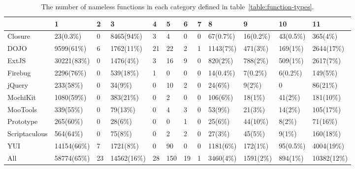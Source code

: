\documentclass[10pt, preprint]{sigplanconf}
\begin{document}
\begin{table}
\centering
  \begin{tabular}{ | l | l | l | l | l | l | l | l | l | l | l | l |}
  \hline
     & 1 & 2 & 3 & 4 & 5 & 6 & 7 & 8 & 9 & 10 & 11 \\ 
  \hline 
   Closure       & 23(0.3\%)  & 0  & 8465(94\%) & 3  & 4  & 0  & 0 & 67(0.7\%)& 16(0.2\%)& 43(0.5\%)& 365(4\%)\\ 
  \hline 
   DOJO          & 9599(61\%) & 6  & 1762(11\%) & 21 & 22 & 2  & 1 & 1143(7\%)& 471(3\%) & 169(1\%) & 2644(17\%) \\ 
  \hline 
   ExtJS         & 30221(83\%)& 0  & 1476(4\%)  & 3  & 16 & 9  & 0 & 820(2\%) & 788(2\%) & 509(1\%) & 2617(7\%) \\ 
  \hline 
   Firebug       & 2296(76\%) & 0  & 539(18\%)  & 1  & 0  & 0  & 0 & 14(0.4\%)& 7(0.2\%) & 6(0.2\%) & 149(5\%) \\ 
  \hline 
   jQuery        & 233(58\%)  & 0  & 34(9\%)    & 0  & 10 & 2  & 0 & 24(6\%)  & 9(2\%)   & 0        & 86(21\%)  \\ 
  \hline 
   MochiKit      & 1080(59\%) & 0  & 383(21\%)  & 0  & 2  & 0  & 0 & 106(6\%) & 18(1\%)  & 41(2\%)  & 181(10\%) \\ 
  \hline 
   MooTools      & 339(55\%)  & 0  & 79(13\%)   & 0  & 4  & 3  & 0 & 53(9\%)  & 21(3\%)  & 14(2\%)  & 105(17\%) \\ 
  \hline 
   Prototype     & 265(60\%)  & 0  & 28(6\%)    & 0  & 0  & 1  & 0 & 25(6\%)  & 44(10\%) & 8(2\%)   & 71(16\%) \\ 
  \hline 
   Scriptaculous & 564(64\%)  & 0  & 75(8\%)    & 0  & 2  & 2  & 0 & 27(3\%)  & 45(5\%)  & 9(1\%)   & 160(18\%) \\ 
  \hline 
   YUI           & 14154(66\%)& 7  & 1721(8\%)  & 0  & 90 & 0  & 0 & 1181(6\%)& 172(1\%) & 95(0.5\%)& 4004(19\%)\\ 
  \hline 
   All           & 58774(65\%)& 23 & 14562(16\%)& 28 & 150& 19 & 1 & 3460(4\%)& 1591(2\%)& 894(1\%) & 10382(12\%) \\ 
  \hline 
  \end{tabular}
\caption{The number of nameless functions in each category defined in table~\ref{table:function-types}.}
\label{function-type-count} 
\end{table} 


 
\end{document}
